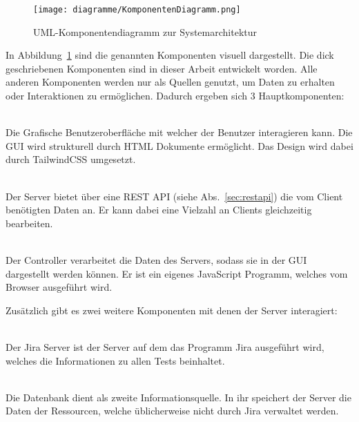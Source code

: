 \begin{figure}[H]
    \texttt{[image: diagramme/KomponentenDiagramm.png]}
    \caption{UML-Komponentendiagramm zur Systemarchitektur}\label{fig:components}
\end{figure}

In Abbildung~\ref{fig:components} sind die genannten Komponenten visuell dargestellt.
Die dick geschriebenen Komponenten sind in dieser Arbeit entwickelt worden. Alle
anderen Komponenten werden nur als Quellen genutzt, um Daten zu erhalten oder Interaktionen zu 
ermöglichen. Dadurch ergeben sich 3 Hauptkomponenten:

\begin{description}
    \hfill\\
    Die Grafische Benutzeroberfläche mit welcher der Benutzer interagieren kann.
    Die \gls{GUI} wird strukturell durch \gls{HTML} Dokumente ermöglicht. 
    Das Design wird dabei durch TailwindCSS umgesetzt.

    \hfill\\
    Der Server bietet über eine \gls{REST} \gls{API} (siehe Abs.~\ref{sec:restapi})
    die vom Client benötigten Daten an. Er kann dabei eine Vielzahl an Clients
    gleichzeitig bearbeiten.

    \hfill\\
    Der Controller verarbeitet die Daten des Servers, sodass sie in der GUI
    dargestellt werden können. Er ist ein eigenes JavaScript Programm,
    welches vom Browser ausgeführt wird.\\
\end{description}

Zusätzlich gibt es zwei weitere Komponenten mit denen der Server interagiert:

\begin{description}
    \hfill\\
    Der \gls{Jira} Server ist der Server auf dem das Programm \gls{Jira} ausgeführt wird, 
    welches die Informationen zu allen Tests beinhaltet.

    \hfill\\
    Die Datenbank dient als zweite Informationsquelle. In ihr speichert der Server
    die Daten der Ressourcen, welche üblicherweise nicht durch \gls{Jira} verwaltet
    werden.
\end{description}

